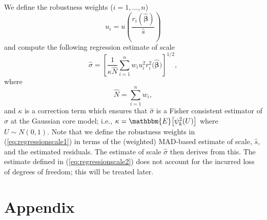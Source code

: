 \documentclass[a4paper,11pt]{scrreprt}
\begin{document}
We define the robustness weights ($i=1, \ldots, n$)
\begin{equation}\label{eq:regressionscale1}
   u_i = u\left(\frac{r_i(\widehat{\bm \beta})}{\widehat{s}}\right)
\end{equation}
\noindent and compute the following regression estimate of scale
\begin{equation}\label{eq:regressionscale2}
   \widehat{\sigma} = \left[ \frac{1}{\kappa \widehat{N}}\sum_{i=1}^n w_i u_i^2 r_i^2\big(\widehat{\bm \beta}\big) \right]^{1/2}, 
\end{equation}
\noindent where 
\begin{equation*}
   \widehat{N} = \sum_{i=1}^n w_i,
\end{equation*}
\noindent and $\kappa$ is a correction term which ensures that $\widehat{\sigma}$ is a Fisher consistent estimator of $\sigma$ at the Gaussian core model; i.e., $\kappa = \mathbbm{E}\big[\psi_k^2(U)\big]$ where $U \sim N(0,1)$. Note that we define the robustness weights in (\ref{eq:regressionscale1}) in terms of the (weighted) MAD-based estimate of scale, $\widehat{s}$, and the estimated residuals. The estimate of scale $\widehat{\sigma}$ then derives from this. The estimate defined in (\ref{eq:regressionscale2}) does not account for the incurred loss of degrees of freedom; this will be treated later. 




{
\singlespacing


}


\appendix
\chapter{Appendix}

 
\end{document}
